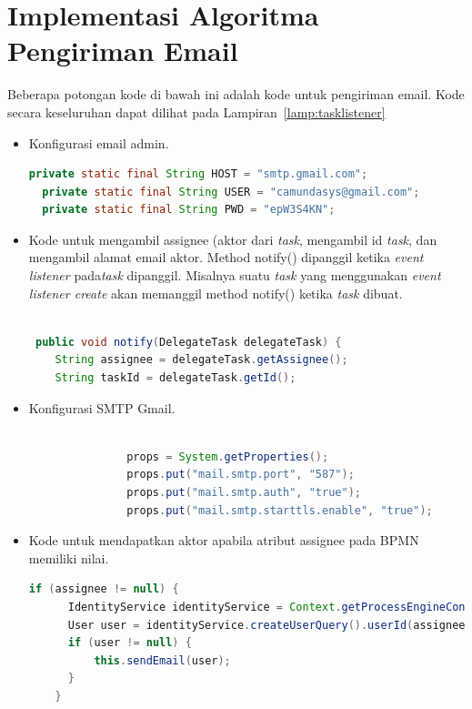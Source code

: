 \section{Implementasi Algoritma Pengiriman Email}
\label{implementasialgo}
Beberapa potongan kode di bawah ini adalah kode untuk pengiriman email. Kode secara keseluruhan dapat dilihat pada Lampiran~\ref{lamp:tasklistener}
\begin{itemize}
	\item Konfigurasi email admin.
\begin{lstlisting}[language=Java,basicstyle=\tiny,caption=TaskAssignmentListener.java]
  private static final String HOST = "smtp.gmail.com";
  private static final String USER = "camundasys@gmail.com";
  private static final String PWD = "epW3S4KN";
\end{lstlisting}
	

	\item Kode untuk mengambil assignee (aktor dari \textit{task}, mengambil id \textit{task}, dan mengambil alamat email aktor. Method notify() dipanggil ketika \textit{event listener} pada\textit{task} dipanggil. Misalnya suatu \textit{task} yang menggunakan \textit{event listener create} akan memanggil method notify() ketika \textit{task} dibuat.
	\begin{lstlisting}[language=Java,basicstyle=\tiny,caption=TaskAssignmentListener.java]

 public void notify(DelegateTask delegateTask) {
    String assignee = delegateTask.getAssignee();
    String taskId = delegateTask.getId();
\end{lstlisting}

	\item Konfigurasi SMTP Gmail.
	\begin{lstlisting}[language=Java,basicstyle=\tiny,caption=TaskAssignmentListener.java]

               props = System.getProperties();
               props.put("mail.smtp.port", "587");
               props.put("mail.smtp.auth", "true");
               props.put("mail.smtp.starttls.enable", "true");

\end{lstlisting}
	\item Kode untuk mendapatkan aktor apabila atribut assignee pada BPMN memiliki nilai.
	\begin{lstlisting}[language=Java,basicstyle=\tiny,caption =TaskAssignmentListener.java]
	if (assignee != null) {
      IdentityService identityService = Context.getProcessEngineConfiguration().getIdentityService();
      User user = identityService.createUserQuery().userId(assignee).singleResult();
      if (user != null) {
    	  this.sendEmail(user);
      }
    }
	\end{lstlisting}
	

\end{itemize}
